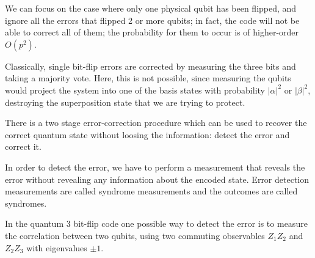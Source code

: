 We can focus on the case where only one physical qubit has been flipped, and ignore all the errors that flipped 2 or more qubits; in fact, the code will not be able to correct all of them; the probability for them to occur is of higher-order $O(p^2)$.


Classically, single bit-flip errors are corrected by measuring the three bits and taking a majority vote. Here, this is not possible, since measuring the qubits would project the system into one of the basis states with probability $|\alpha|^{2}$ or $|\beta|^{2}$,
destroying the superposition state that we are trying to protect. 

There is a two stage error-correction procedure which can be used to recover the correct quantum state without loosing the information: detect the error and correct it.  


In order to detect the error, we have to perform a measurement that reveals the error without revealing any information about the encoded state.
Error detection measurements are called syndrome measurements and the outcomes are called syndromes. 

In the quantum 3 bit-flip code one possible way to detect the error is to measure the correlation between two qubits, using two  commuting observables $Z_1 Z_2$ and $Z_2 Z_3$ with eigenvalues $\pm 1$.


